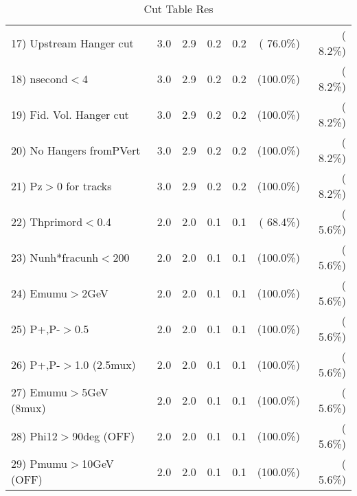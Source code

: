 \begin{table}[h!]
\begin{tabular}{||l||r|r|r|r|r|r||}
 17) Upstream Hanger cut  &          3.0 &          2.9 &          0.2 &          0.2 & ( 76.0\%) & (  8.2\%) \\
 18) nsecond$<$4          &          3.0 &          2.9 &          0.2 &          0.2 & (100.0\%) & (  8.2\%) \\
 19) Fid. Vol. Hanger cut &          3.0 &          2.9 &          0.2 &          0.2 & (100.0\%) & (  8.2\%) \\
 20) No Hangers fromPVert &          3.0 &          2.9 &          0.2 &          0.2 & (100.0\%) & (  8.2\%) \\
 21) Pz$>$0 for tracks    &          3.0 &          2.9 &          0.2 &          0.2 & (100.0\%) & (  8.2\%) \\
 22) Thprimord$<$0.4      &          2.0 &          2.0 &          0.1 &          0.1 & ( 68.4\%) & (  5.6\%) \\
 23) Nunh*fracunh$<$200   &          2.0 &          2.0 &          0.1 &          0.1 & (100.0\%) & (  5.6\%) \\
 24) Emumu$>$2GeV         &          2.0 &          2.0 &          0.1 &          0.1 & (100.0\%) & (  5.6\%) \\
 25) P+,P-$>$0.5          &          2.0 &          2.0 &          0.1 &          0.1 & (100.0\%) & (  5.6\%) \\
 26) P+,P-$>$1.0 (2.5mux) &          2.0 &          2.0 &          0.1 &          0.1 & (100.0\%) & (  5.6\%) \\
 27) Emumu$>$5GeV  (8mux) &          2.0 &          2.0 &          0.1 &          0.1 & (100.0\%) & (  5.6\%) \\
 28) Phi12$>$90deg  (OFF) &          2.0 &          2.0 &          0.1 &          0.1 & (100.0\%) & (  5.6\%) \\
 29) Pmumu$>$10GeV  (OFF) &          2.0 &          2.0 &          0.1 &          0.1 & (100.0\%) & (  5.6\%) \\
 \hline
 \hline
 \end{tabular}
 \caption{Cut Table  Res      }
 \label{tab-cutcohjpsi-mumu_res}
 \end{table}
